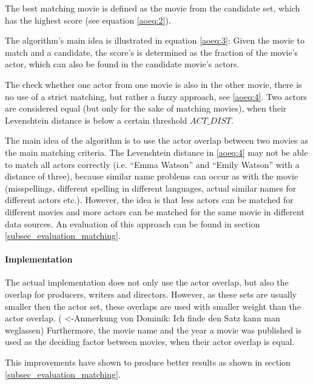 The best matching movie is defined as the movie from the candidate set, which has the highest score (see equation \ref{aoeq:2}).

The algorithm's main idea is illustrated in equation \ref{aoeq:3}: Given the movie to match and a candidate, the score's is determined as the fraction of the movie's actor, which can also be found in the candidate movie's actors.

The check whether one actor from one movie is also in the other movie, there is no use of a strict matching, but rather a fuzzy approach, see \ref{aoeq:4}.
Two actors are considered equal (but only for the sake of matching movies), when their Levenshtein distance is below a certain threshold $ACT\_DIST$.

The main idea of the algorithm is to use the actor overlap between two movies as the main matching criteria.
The Levenshtein distance in \ref{aoeq:4} may not be able to match all actors correctly (i.e. "`Emma Watson"' and "`Emily Watson"' with a distance of three), because similar name problems can occur as with the movie (misspellings, different spelling in different languages, actual similar names for different actors etc.).
However, the idea is that less actors can be matched for different movies and more actors can be matched for the same movie in different data sources.
An evaluation of this approach can be found in section \ref{subsec_evaluation_matching}.

\paragraph{Implementation}
The actual implementation does not only use the actor overlap, but also the overlap for producers, writers and directors.
However, as these sets are usually smaller then the actor set, these overlaps are used with smaller weight than the actor overlap. ( <-Anmerkung von Dominik: Ich finde den Satz kann man weglassen)
Furthermore, the movie name and the year a movie was published is used as the deciding factor between movies, when their actor overlap is equal.

This improvements have shown to produce better results as shown in section \ref{subsec_evaluation_matching}.
